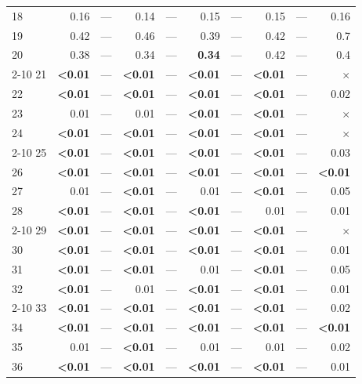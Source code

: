 \begin{longtable}{lr@{\hskip 4pt}l@{\hskip 12pt}r@{\hskip 4pt}l@{\hskip 12pt}r@{\hskip 4pt}l@{\hskip 12pt}r@{\hskip 4pt}l@{\hskip 12pt}r}
18 & 0.16 & --- & 0.14 & --- & 0.15 & --- & 0.15 & --- & 0.16 \\
19 & 0.42 & --- & 0.46 & --- & 0.39 & --- & 0.42 & --- & 0.7 \\
20 & 0.38 & --- & 0.34 & --- & \textbf{0.34} & --- & 0.42 & --- & 0.4 \\
\cmidrule{2-10}
21 & \textbf{<0.01} & --- & \textbf{<0.01} & --- & \textbf{<0.01} & --- & \textbf{<0.01} & --- & $\times$ \\
22 & \textbf{<0.01} & --- & \textbf{<0.01} & --- & \textbf{<0.01} & --- & \textbf{<0.01} & --- & 0.02 \\
23 & 0.01 & --- & 0.01 & --- & \textbf{<0.01} & --- & \textbf{<0.01} & --- & $\times$ \\
24 & \textbf{<0.01} & --- & \textbf{<0.01} & --- & \textbf{<0.01} & --- & \textbf{<0.01} & --- & $\times$ \\
\cmidrule{2-10}
25 & \textbf{<0.01} & --- & \textbf{<0.01} & --- & \textbf{<0.01} & --- & \textbf{<0.01} & --- & 0.03 \\
26 & \textbf{<0.01} & --- & \textbf{<0.01} & --- & \textbf{<0.01} & --- & \textbf{<0.01} & --- & \textbf{<0.01} \\
27 & 0.01 & --- & \textbf{<0.01} & --- & 0.01 & --- & \textbf{<0.01} & --- & 0.05 \\
28 & \textbf{<0.01} & --- & \textbf{<0.01} & --- & \textbf{<0.01} & --- & 0.01 & --- & 0.01 \\
\cmidrule{2-10}
29 & \textbf{<0.01} & --- & \textbf{<0.01} & --- & \textbf{<0.01} & --- & \textbf{<0.01} & --- & $\times$ \\
30 & \textbf{<0.01} & --- & \textbf{<0.01} & --- & \textbf{<0.01} & --- & \textbf{<0.01} & --- & 0.01 \\
31 & \textbf{<0.01} & --- & \textbf{<0.01} & --- & 0.01 & --- & \textbf{<0.01} & --- & 0.05 \\
32 & \textbf{<0.01} & --- & 0.01 & --- & \textbf{<0.01} & --- & \textbf{<0.01} & --- & 0.01 \\
\cmidrule{2-10}
33 & \textbf{<0.01} & --- & \textbf{<0.01} & --- & \textbf{<0.01} & --- & \textbf{<0.01} & --- & 0.02 \\
34 & \textbf{<0.01} & --- & \textbf{<0.01} & --- & \textbf{<0.01} & --- & \textbf{<0.01} & --- & \textbf{<0.01} \\
35 & 0.01 & --- & \textbf{<0.01} & --- & 0.01 & --- & 0.01 & --- & 0.02 \\
36 & \textbf{<0.01} & --- & \textbf{<0.01} & --- & \textbf{<0.01} & --- & \textbf{<0.01} & --- & 0.01 \\

\end{longtable}
